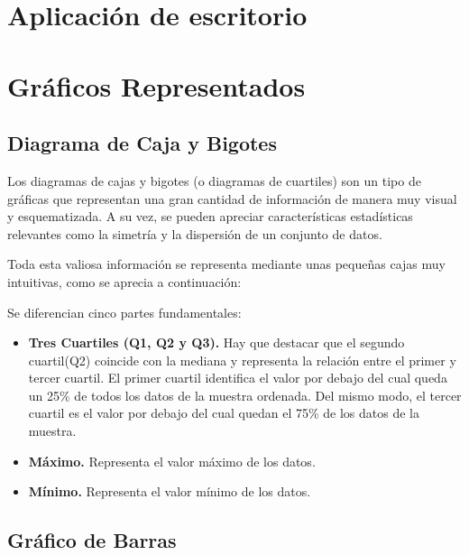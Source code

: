 \section{Aplicación de escritorio}

\section{Gráficos Representados}


\subsection{Diagrama de Caja y Bigotes}
Los diagramas de cajas y bigotes (o diagramas de cuartiles) son un tipo de gráficas que representan una gran cantidad de información de manera muy visual y esquematizada. A su vez, se pueden apreciar características estadísticas relevantes como la simetría y la dispersión de un conjunto de datos.

Toda esta valiosa información se representa mediante unas pequeñas cajas muy intuitivas, como se aprecia a continuación:


Se diferencian cinco partes fundamentales: 
\begin{itemize}
	\item 
	\textbf{Tres Cuartiles (Q1, Q2 y Q3).} Hay que destacar que el segundo cuartil(Q2) coincide con la mediana y representa la relación entre el primer y tercer cuartil. El primer cuartil identifica el valor por debajo del cual queda un 25\% de todos los datos de la muestra ordenada. Del mismo modo, el tercer cuartil es el valor por debajo del cual quedan el 75\% de los datos de la muestra.
	\item 
	\textbf{Máximo.} Representa el valor máximo de los datos.
	\item 
	\textbf{Mínimo.} Representa el valor mínimo de los datos.
\end{itemize}

\subsection{Gráfico de Barras}
